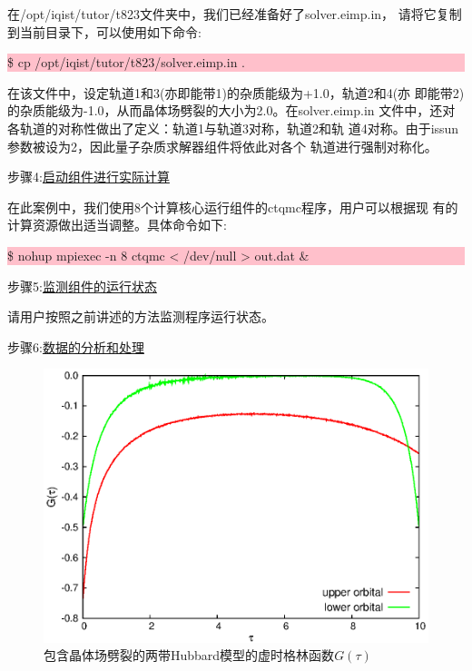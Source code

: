在/opt/iqist/tutor/t823文件夹中，我们已经准备好了solver.eimp.in，
请将它复制到当前目录下，可以使用如下命令:

\noindent\colorbox{pink}{\parbox[r]{\linewidth}{\quad \$ cp /opt/iqist/tutor/t823/solver.eimp.in . }}

在该文件中，设定轨道1和3(亦即能带1)的杂质能级为+1.0，轨道2和4(亦
即能带2)的杂质能级为-1.0，从而晶体场劈裂的大小为2.0。在solver.eimp.in
文件中，还对各轨道的对称性做出了定义：轨道1与轨道3对称，轨道2和轨
道4对称。由于issun参数被设为2，因此量子杂质求解器组件将依此对各个
轨道进行强制对称化。

步骤4:\underline{启动{\azalea}组件进行实际计算}

在此案例中，我们使用8个计算核心运行{\azalea}组件的ctqmc程序，用户可以根据现
有的计算资源做出适当调整。具体命令如下:

\noindent\colorbox{pink}{\parbox[r]{\linewidth}{\quad \$ nohup mpiexec -n 8 ctqmc < /dev/null >  out.dat \&}}

步骤5:\underline{监测{\azalea}组件的运行状态}

请用户按照之前讲述的方法监测程序运行状态。

步骤6:\underline{数据的分析和处理}

\begin{figure}
\centering
\includegraphics{figure/green-t823.eps}
\caption{包含晶体场劈裂的两带Hubbard模型的虚时格林函数$G(\tau)$} 
\label{fig:green-t823}
\end{figure}

